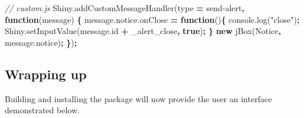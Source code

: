 \documentclass[
]{krantz}
\makeatletter
\newenvironment{Shaded}{\begin{snugshade}}{\end{snugshade}}
\newcommand{\AttributeTok}[1]{\textcolor[rgb]{0.61,0.61,0.61}{#1}}
\newcommand{\CommentTok}[1]{\textcolor[rgb]{0.37,0.37,0.37}{\textit{#1}}}
\newcommand{\ControlFlowTok}[1]{\textcolor[rgb]{0.27,0.27,0.27}{\textbf{#1}}}
\newcommand{\KeywordTok}[1]{\textcolor[rgb]{0.27,0.27,0.27}{\textbf{#1}}}
\newcommand{\NormalTok}[1]{#1}
\newcommand{\OperatorTok}[1]{\textcolor[rgb]{0.43,0.43,0.43}{\textbf{#1}}}
\newcommand{\StringTok}[1]{\textcolor[rgb]{0.5,0.5,0.5}{#1}}
\newcommand{\VariableTok}[1]{\textcolor[rgb]{0,0,0}{#1}}
\newenvironment{kframe}{%
\medskip{}
\setlength{\fboxsep}{.8em}
 \def\at@end@of@kframe{}%
 \ifinner\ifhmode%
  \def\at@end@of@kframe{\end{minipage}}%
  \begin{minipage}{\columnwidth}%
 \fi\fi%
 \def\FrameCommand##1{\hskip\@totalleftmargin \hskip-\fboxsep
 \colorbox{shadecolor}{##1}\hskip-\fboxsep
     \hskip-\linewidth \hskip-\@totalleftmargin \hskip\columnwidth}%
 \MakeFramed {\advance\hsize-\width
   \@totalleftmargin\z@ \linewidth\hsize
   \@setminipage}}%
 {\par\unskip\endMakeFramed%
 \at@end@of@kframe}
\renewenvironment{Shaded}{\begin{kframe}}{\end{kframe}}
\makeatother
\begin{document}
\begin{Shaded}
\begin{Highlighting}[]
\CommentTok{// custom.js}
\VariableTok{Shiny}\NormalTok{.}\AttributeTok{addCustomMessageHandler}\NormalTok{(type }\OperatorTok{=} \StringTok{\textquotesingle{}send{-}alert\textquotesingle{}}\OperatorTok{,} \KeywordTok{function}\NormalTok{(message) }\OperatorTok{\{}
  \VariableTok{message}\NormalTok{.}\VariableTok{notice}\NormalTok{.}\AttributeTok{onClose} \OperatorTok{=} \KeywordTok{function}\NormalTok{()}\OperatorTok{\{}
    \VariableTok{console}\NormalTok{.}\AttributeTok{log}\NormalTok{(}\StringTok{"close"}\NormalTok{)}\OperatorTok{;}
    \VariableTok{Shiny}\NormalTok{.}\AttributeTok{setInputValue}\NormalTok{(}\VariableTok{message}\NormalTok{.}\AttributeTok{id} \OperatorTok{+} \StringTok{\textquotesingle{}\_alert\_close\textquotesingle{}}\OperatorTok{,} \KeywordTok{true}\NormalTok{)}\OperatorTok{;}
  \OperatorTok{\}}
  \KeywordTok{new} \AttributeTok{jBox}\NormalTok{(}\StringTok{\textquotesingle{}Notice\textquotesingle{}}\OperatorTok{,} \VariableTok{message}\NormalTok{.}\AttributeTok{notice}\NormalTok{)}\OperatorTok{;}
\OperatorTok{\}}\NormalTok{)}\OperatorTok{;}
\end{Highlighting}
\end{Shaded}

\hypertarget{wrapping-up}{%
\subsection*{Wrapping up}\label{wrapping-up}}


Building and installing the package will now provide the user an interface demonstrated below.

\begin{Shaded}
\end{Shaded}
\end{document}
